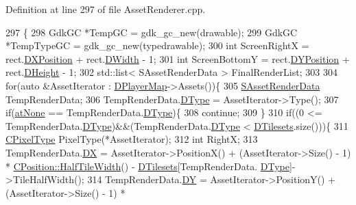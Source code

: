 Definition at line 297 of file Asset\+Renderer.\+cpp.


\begin{DoxyCode}
297                                                                                                        \{
298     GdkGC *TempGC = gdk\_gc\_new(drawable);
299     GdkGC *TempTypeGC = gdk\_gc\_new(typedrawable);
300     \textcolor{keywordtype}{int} ScreenRightX = rect.\hyperlink{structSRectangle_abcbddb03b3ee416cc33109833b5f075c}{DXPosition} + rect.\hyperlink{structSRectangle_a4150898b3f7d90f6e4b0d44bf1ae3bd2}{DWidth} - 1;
301     \textcolor{keywordtype}{int} ScreenBottomY = rect.\hyperlink{structSRectangle_a120aa0a90033bc6e07c36c151a3bbc71}{DYPosition} + rect.\hyperlink{structSRectangle_a84ea3c2314c43cab6186170662188899}{DHeight} - 1;
302     std::list< SAssetRenderData > FinalRenderList;
303     
304     \textcolor{keywordflow}{for}(\textcolor{keyword}{auto} &AssetIterator : \hyperlink{classCAssetRenderer_a422a3f7e4202e73431fba7036e494dfe}{DPlayerMap}->Assets())\{
305         \hyperlink{structSAssetRenderData}{SAssetRenderData} TempRenderData;
306         TempRenderData.\hyperlink{structSAssetRenderData_ae986cfe9d4238fa31fb511b40392d97f}{DType} = AssetIterator->Type();
307         \textcolor{keywordflow}{if}(\hyperlink{GameDataTypes_8h_a5600d4fc433b83300308921974477feca82fb51718e2c00981a2d37bc6fe92593}{atNone} == TempRenderData.\hyperlink{structSAssetRenderData_ae986cfe9d4238fa31fb511b40392d97f}{DType})\{
308             \textcolor{keywordflow}{continue};   
309         \}
310         \textcolor{keywordflow}{if}((0 <= TempRenderData.\hyperlink{structSAssetRenderData_ae986cfe9d4238fa31fb511b40392d97f}{DType})&&(TempRenderData.\hyperlink{structSAssetRenderData_ae986cfe9d4238fa31fb511b40392d97f}{DType} < 
      \hyperlink{classCAssetRenderer_ae8201de704851c1de6424a8da77b785e}{DTilesets}.size()))\{
311             \hyperlink{classCPixelType}{CPixelType} PixelType(*AssetIterator); 
312             \textcolor{keywordtype}{int} RightX;
313             TempRenderData.\hyperlink{structSAssetRenderData_ab432edfd1146e38a92576b78e2ad5581}{DX} = AssetIterator->PositionX() + (AssetIterator->Size() - 1) * 
      \hyperlink{classCPosition_a4b799a0fb78ddd8bbd8548980e2458af}{CPosition::HalfTileWidth}() - \hyperlink{classCAssetRenderer_ae8201de704851c1de6424a8da77b785e}{DTilesets}[TempRenderData.
      \hyperlink{structSAssetRenderData_ae986cfe9d4238fa31fb511b40392d97f}{DType}]->TileHalfWidth();
314             TempRenderData.\hyperlink{structSAssetRenderData_af27e8a46e21a0935983bfc0d34d9ceba}{DY} = AssetIterator->PositionY() + (AssetIterator->Size() - 1) * 

\end{DoxyCode}
